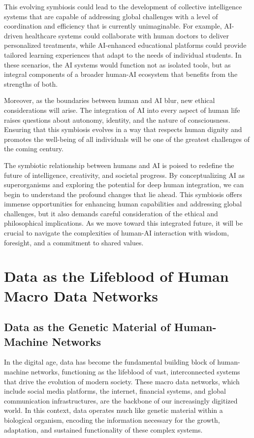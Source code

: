 \documentclass[12pt,twoside]{article}
\begin{document}
This evolving symbiosis could lead to the development of collective intelligence systems that are capable of addressing global challenges with a level of coordination and efficiency that is currently unimaginable. For example, AI-driven healthcare systems could collaborate with human doctors to deliver personalized treatments, while AI-enhanced educational platforms could provide tailored learning experiences that adapt to the needs of individual students. In these scenarios, the AI systems would function not as isolated tools, but as integral components of a broader human-AI ecosystem that benefits from the strengths of both.

Moreover, as the boundaries between human and AI blur, new ethical considerations will arise. The integration of AI into every aspect of human life raises questions about autonomy, identity, and the nature of consciousness. Ensuring that this symbiosis evolves in a way that respects human dignity and promotes the well-being of all individuals will be one of the greatest challenges of the coming century.

The symbiotic relationship between humans and AI is poised to redefine the future of intelligence, creativity, and societal progress. By conceptualizing AI as superorganisms and exploring the potential for deep human integration, we can begin to understand the profound changes that lie ahead. This symbiosis offers immense opportunities for enhancing human capabilities and addressing global challenges, but it also demands careful consideration of the ethical and philosophical implications. As we move toward this integrated future, it will be crucial to navigate the complexities of human-AI interaction with wisdom, foresight, and a commitment to shared values.


\section{Data as the Lifeblood of Human Macro Data Networks}

\subsection{Data as the Genetic Material of Human-Machine Networks}

In the digital age, data has become the fundamental building block of human-machine networks, functioning as the lifeblood of vast, interconnected systems that drive the evolution of modern society. These macro data networks, which include social media platforms, the internet, financial systems, and global communication infrastructures, are the backbone of our increasingly digitized world. In this context, data operates much like genetic material within a biological organism, encoding the information necessary for the growth, adaptation, and sustained functionality of these complex systems.
\end{document}

